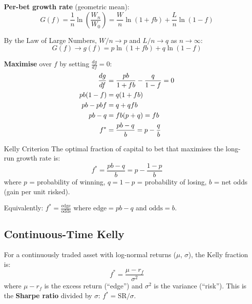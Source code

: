 \documentclass[12pt,a4paper,openany]{report}
\theoremstyle{definition}
\begin{document}
\textbf{Per-bet growth rate} (geometric mean):
\begin{equation}
  G(f) = \frac{1}{n}\ln\!\left(\frac{W_n}{W_0}\right) = \frac{W}{n}\ln(1+fb) + \frac{L}{n}\ln(1-f)
\end{equation}

By the Law of Large Numbers, $W/n \to p$ and $L/n \to q$ as $n \to \infty$:
\begin{equation}
  G(f) \to g(f) = p\ln(1+fb) + q\ln(1-f)
\end{equation}

\textbf{Maximise} over $f$ by setting $\frac{dg}{df} = 0$:
\begin{align}
  \frac{dg}{df} &= \frac{pb}{1+fb} - \frac{q}{1-f} = 0 \notag \\
  pb(1-f) &= q(1+fb) \notag \\
  pb - pbf &= q + qfb \notag \\
  pb - q &= fb(p + q) = fb \notag \\
  f^* &= \frac{pb - q}{b} = p - \frac{q}{b}
\end{align}

\begin{definitionbox}{Kelly Criterion}
The optimal fraction of capital to bet that maximises the long-run growth rate is:
\[
  f^* = \frac{pb - q}{b} = p - \frac{1-p}{b}
\]
where $p$ = probability of winning, $q = 1-p$ = probability of losing, $b$ = net odds (gain per unit risked).

Equivalently: $f^* = \frac{\text{edge}}{\text{odds}}$ where $\text{edge} = pb - q$ and $\text{odds} = b$.
\end{definitionbox}

\subsection{Continuous-Time Kelly}

For a continuously traded asset with log-normal returns ($\mu$, $\sigma$), the Kelly fraction is:
\begin{equation}
  f^* = \frac{\mu - r_f}{\sigma^2}
\end{equation}
where $\mu - r_f$ is the excess return (``edge'') and $\sigma^2$ is the variance (``risk''). This is the \textbf{Sharpe ratio} divided by $\sigma$: $f^* = \text{SR}/\sigma$.
\end{document}
